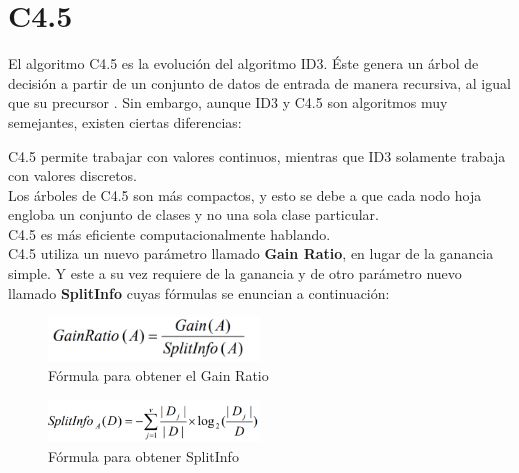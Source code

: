 \section{C4.5} \label{c4.5}
El algoritmo C4.5 es la evolución del algoritmo ID3. Éste genera un árbol de decisión a partir de un conjunto de datos de entrada de manera recursiva, al igual que su precursor \cite{c4.5}. Sin embargo, aunque ID3 y C4.5 son algoritmos muy semejantes, existen ciertas diferencias:\\

\begin{UClist}
	\UCli C4.5 permite trabajar con valores continuos, mientras que ID3 solamente trabaja con valores discretos.\\
	\UCli Los árboles de C4.5 son más compactos, y esto se debe a que cada nodo hoja engloba un conjunto de clases y no una sola clase particular.\\
	\UCli C4.5 es más eficiente computacionalmente hablando.\\
	\UCli C4.5 utiliza un nuevo parámetro llamado \textbf{Gain Ratio}, en lugar de la ganancia simple. Y este a su vez requiere de la ganancia y de otro parámetro nuevo llamado \textbf{SplitInfo} cuyas fórmulas se enuncian a continuación\cite{c4.5}:
	
	\begin{figure}[H]
		\hypertarget{fig:formula-gainratio}{\hspace{1pt}}
		\begin{center}
			\includegraphics[width=0.5\textwidth]{capitulo2/images/formula-gainratio.png}
			\caption{Fórmula para obtener el Gain Ratio}
			\label{fig:formula-gainratio}
		\end{center}
	\end{figure}

	\begin{figure}[H]
		\hypertarget{fig:formula-splitinfo}{\hspace{1pt}}
		\begin{center}
			\includegraphics[width=0.5\textwidth]{capitulo2/images/formula-splitinfo.png}
			\caption{Fórmula para obtener SplitInfo}
			\label{fig:formula-splitinfo}
		\end{center}
	\end{figure}

\end{UClist}

